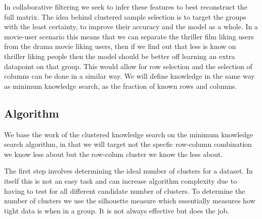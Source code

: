 In collaborative filtering we seek to infer these features to best reconstruct the full matrix. The idea behind clustered sample selection is to target the groups with the least certainty, to improve their accuracy and the model as a whole. In a movie-user scenario this means that we can separate the thriller film liking users from the drama movie liking users, then if we find out that less is know on thriller liking people then the model should be better off learning an extra datapoint on that group. This would allow for row selection and the selection of columns can be done in a similar way. We will define knowledge in the same way as minimum knowledge search, as the fraction of known rows and columns.



\subsection{Algorithm}

We base the work of the clustered knowledge search on the minimum knowledge search algorithm, in that we will target not the specfic row-column combination we know less about but the row-colum cluster we know the less about. 

The first step involves determining the ideal number of clusters for a dataset. In itself this is not an easy task and can increase algorithm complexity due to having to test for all different candidate number of clusters. To determine the number of clusters we use the silhouette measure \cite{kmean-sil} which essentially measures how tight data is when in a group. It is not always effective but does the job. 



